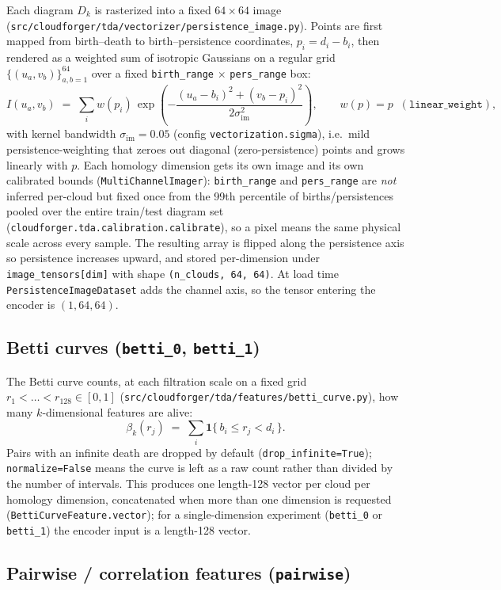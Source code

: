 \documentclass[11pt]{article}
\begin{document}
Each diagram $D_k$ is rasterized into a fixed $64\times64$ image
(\texttt{src/cloudforger/tda/vectorizer/persistence\_image.py}). Points are
first mapped from birth--death to birth--persistence coordinates,
$p_i = d_i - b_i$, then rendered as a weighted sum of isotropic Gaussians on
a regular grid $\{(u_a, v_b)\}_{a,b=1}^{64}$ over a fixed
\texttt{birth\_range} $\times$ \texttt{pers\_range} box:
\[
  I(u_a,v_b) \;=\; \sum_{i} w(p_i)\,
    \exp\!\left(-\frac{(u_a-b_i)^2+(v_b-p_i)^2}{2\sigma_{\mathrm{im}}^2}\right),
  \qquad w(p)=p \;\;(\texttt{linear\_weight}),
\]
with kernel bandwidth $\sigma_{\mathrm{im}}=0.05$ (config
\texttt{vectorization.sigma}), i.e.\ mild persistence-weighting that zeroes
out diagonal (zero-persistence) points and grows linearly with $p$. Each
homology dimension gets its own image and its own calibrated bounds
(\texttt{MultiChannelImager}): \texttt{birth\_range} and \texttt{pers\_range}
are \emph{not} inferred per-cloud but fixed once from the 99th percentile of
births/persistences pooled over the entire train/test diagram set
(\texttt{cloudforger.tda.calibration.calibrate}), so a pixel means the same
physical scale across every sample. The resulting array is flipped along the
persistence axis so persistence increases upward, and stored per-dimension
under \texttt{image\_tensors[dim]} with shape \texttt{(n\_clouds, 64, 64)}.
At load time \texttt{PersistenceImageDataset} adds the channel axis, so the
tensor entering the encoder is $(1,64,64)$.

\subsection{Betti curves (\texttt{betti\_0}, \texttt{betti\_1})}

The Betti curve counts, at each filtration scale on a fixed grid
$r_1<\dots<r_{128}\in[0,1]$ (\texttt{src/cloudforger/tda/features/betti\_curve.py}),
how many $k$-dimensional features are alive:
\[
  \beta_k(r_j) \;=\; \sum_i \mathbf 1\{\, b_i \le r_j < d_i \,\}.
\]
Pairs with an infinite death are dropped by default
(\texttt{drop\_infinite=True}); \texttt{normalize=False} means the curve is
left as a raw count rather than divided by the number of intervals. This
produces one length-128 vector per cloud per homology dimension,
concatenated when more than one dimension is requested
(\texttt{BettiCurveFeature.vector}); for a single-dimension experiment
(\texttt{betti\_0} or \texttt{betti\_1}) the encoder input is a length-128
vector.

\subsection{Pairwise / correlation features (\texttt{pairwise})}
\end{document}
